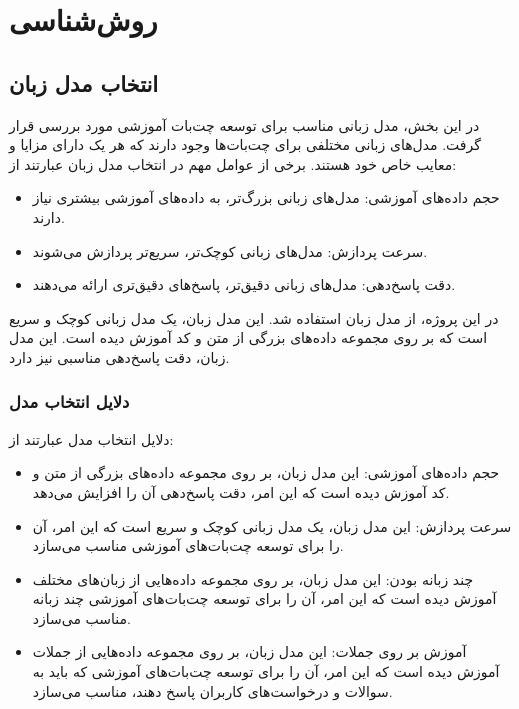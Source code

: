 \chapter{روش‌شناسی}

\section{انتخاب مدل زبان}

در این بخش، مدل زبانی مناسب برای توسعه چت‌بات آموزشی مورد بررسی قرار گرفت. مدل‌های زبانی مختلفی برای چت‌بات‌ها وجود دارند که هر یک دارای مزایا و معایب خاص خود هستند. برخی از عوامل مهم در انتخاب مدل زبان عبارتند از:

\begin{itemize}
    \item حجم داده‌های آموزشی: مدل‌های زبانی بزرگ‌تر، به داده‌های آموزشی بیشتری نیاز دارند.
    \item سرعت پردازش: مدل‌های زبانی کوچک‌تر، سریع‌تر پردازش می‌شوند.
    \item دقت پاسخ‌دهی: مدل‌های زبانی دقیق‌تر، پاسخ‌های دقیق‌تری ارائه می‌دهند.
\end{itemize}

در این پروژه، از مدل زبان  استفاده شد. این مدل زبان، یک مدل زبانی کوچک و سریع است که بر روی مجموعه داده‌های بزرگی از متن و کد آموزش دیده است. این مدل زبان، دقت پاسخ‌دهی مناسبی نیز دارد.

\subsection{دلایل انتخاب مدل }

دلایل انتخاب مدل  عبارتند از:

\begin{itemize}
    \item حجم داده‌های آموزشی: این مدل زبان، بر روی مجموعه داده‌های بزرگی از متن و کد آموزش دیده است که این امر، دقت پاسخ‌دهی آن را افزایش می‌دهد.
    \item سرعت پردازش: این مدل زبان، یک مدل زبانی کوچک و سریع است که این امر، آن را برای توسعه چت‌بات‌های آموزشی مناسب می‌سازد.
    \item چند زبانه بودن: این مدل زبان، بر روی مجموعه داده‌هایی از زبان‌های مختلف آموزش دیده است که این امر، آن را برای توسعه چت‌بات‌های آموزشی چند زبانه مناسب می‌سازد.
    \item آموزش بر روی جملات: این مدل زبان، بر روی مجموعه داده‌هایی از جملات آموزش دیده است که این امر، آن را برای توسعه چت‌بات‌های آموزشی که باید به سوالات و درخواست‌های کاربران پاسخ دهند، مناسب می‌سازد.
\end{itemize}

